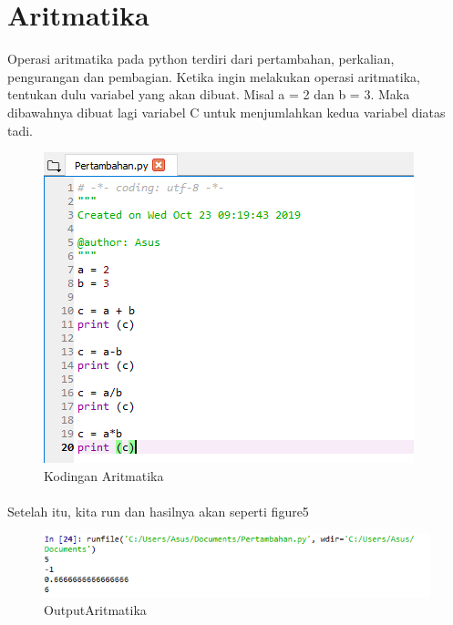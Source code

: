 \documentclass{article}
\begin{document}
\section{Aritmatika}
Operasi aritmatika pada python terdiri dari pertambahan, perkalian, pengurangan dan pembagian. Ketika ingin melakukan operasi aritmatika, tentukan dulu variabel yang akan dibuat. Misal a = 2 dan b = 3. Maka dibawahnya dibuat lagi variabel C untuk menjumlahkan kedua variabel diatas tadi.
\begin{figure}[!htbp]
    \centering
    \includegraphics[scale=1]{Aritmatika.PNG}
    \caption{Kodingan Aritmatika}
\end{figure}
\paragraph{}
Setelah itu, kita run dan hasilnya akan seperti figure5
\begin{figure}[!htbp]
    \centering
    \includegraphics[scale=0.7]{OutputAritmatika.PNG}
    \caption{OutputAritmatika}
\end{figure}
\newpage
\end{document}
